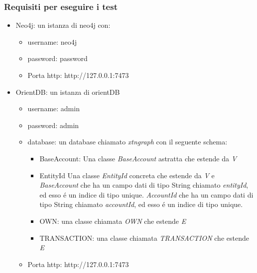 \subsubsection{Requisiti per eseguire i test}
\begin{itemize}
\item{Neo4j}: un istanza di neo4j con:
\begin{itemize}
\item{username:} neo4j
\item{password:} password
\item{Porta http:} http://127.0.0.1:7473
\end{itemize}
\item{OrientDB:} un istanza di orientDB
\begin{itemize}
\item{username:} admin
\item{password:} admin
\item{database:} un database chiamato \textit{xtn\textunderscore graph} con il seguente schema:
\begin{itemize}
\item{BaseAccount:} Una classe \textit{BaseAccount} astratta che estende da \textit{V}
\item{EntityId} Una classe \textit{EntityId} concreta che estende da \textit{V} e \textit{BaseAccount} che ha un campo dati di tipo String chiamato \textit{entityId}, ed esso \'e un indice di tipo unique.
\textit{AccountId} che ha un campo dati di tipo String chiamato \textit{accountId}, ed esso \'e un indice di tipo unique.
\item{OWN:} una classe chiamata \textit{OWN} che estende \textit{E}
\item{TRANSACTION}: una classe chiamata \textit{TRANSACTION} che estende \textit{E}
\end{itemize}
\item{Porta http:} http://127.0.0.1:7473
\end{itemize}
\end{itemize}



